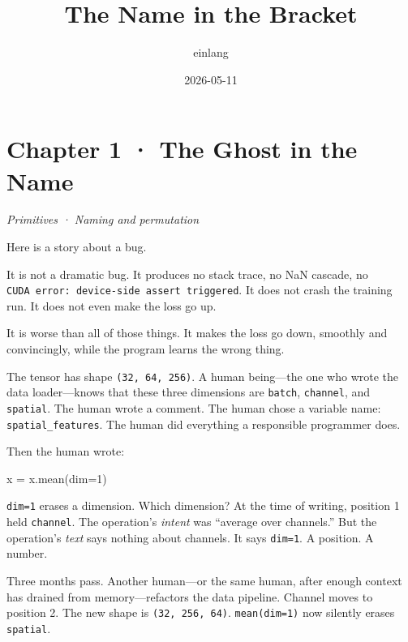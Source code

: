 \documentclass[11pt,titlepage]{article}
\title{The Name in the Bracket}
\author{einlang}
\date{2026-05-11}
\newenvironment{Shaded}{}{}
\newcommand{\DecValTok}[1]{\textcolor[rgb]{0.25,0.63,0.44}{#1}}
\newcommand{\NormalTok}[1]{#1}
\newcommand{\OperatorTok}[1]{\textcolor[rgb]{0.40,0.40,0.40}{#1}}
\begin{document}
\maketitle

{
\hypersetup{linkcolor=}
\setcounter{tocdepth}{2}
\tableofcontents
}
\newpage

\hypertarget{chapter-1-the-ghost-in-the-name}{%
\section{Chapter 1 · The Ghost in the
Name}\label{chapter-1-the-ghost-in-the-name}}

\emph{Primitives · Naming and permutation}

\vspace{2em}

Here is a story about a bug.

It is not a dramatic bug. It produces no stack trace, no NaN cascade, no
\texttt{CUDA\ error:\ device-side\ assert\ triggered}. It does not crash
the training run. It does not even make the loss go up.

It is worse than all of those things. It makes the loss go down,
smoothly and convincingly, while the program learns the wrong thing.

The tensor has shape \texttt{(32,\ 64,\ 256)}. A human being---the one
who wrote the data loader---knows that these three dimensions are
\texttt{batch}, \texttt{channel}, and \texttt{spatial}. The human wrote
a comment. The human chose a variable name: \texttt{spatial\_features}.
The human did everything a responsible programmer does.

Then the human wrote:

\begin{Shaded}
\begin{Highlighting}[]
\NormalTok{x }\OperatorTok{=}\NormalTok{ x.mean(dim}\OperatorTok{=}\DecValTok{1}\NormalTok{)}
\end{Highlighting}
\end{Shaded}

\texttt{dim=1} erases a dimension. Which dimension? At the time of
writing, position 1 held \texttt{channel}. The operation's \emph{intent}
was ``average over channels.'' But the operation's \emph{text} says
nothing about channels. It says \texttt{dim=1}. A position. A number.

Three months pass. Another human---or the same human, after enough
context has drained from memory---refactors the data pipeline. Channel
moves to position 2. The new shape is \texttt{(32,\ 256,\ 64)}.
\texttt{mean(dim=1)} now silently erases \texttt{spatial}.
\end{document}
